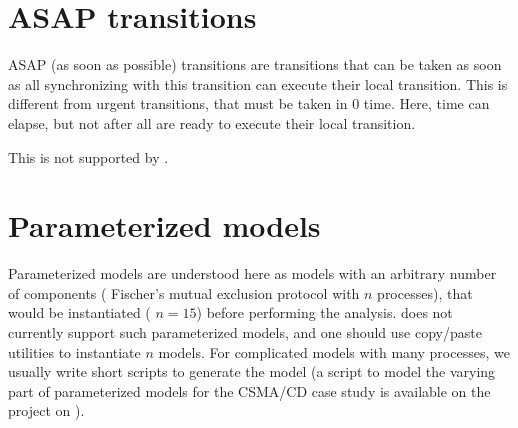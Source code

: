 % 




\section{ASAP transitions}

ASAP (as soon as possible) transitions are transitions that can be taken as soon as all \IPTA{} synchronizing with this transition can execute their local transition.
This is different from urgent transitions, that must be taken in 0 time.
Here, time can elapse, but not after all \IPTA{} are ready to execute their local transition.

This is not supported by \imitator{}. %



\section{Parameterized models}

Parameterized models are understood here as models with an arbitrary number of components (\eg{} Fischer's mutual exclusion protocol with $n$ processes), that would be instantiated (\eg{} $n = 15$) before performing the analysis.
\imitator{} does not currently support such parameterized models, and one should use copy/paste utilities to instantiate $n$ models.
For complicated models with many processes, we usually write short scripts to generate the model (a script  to model the varying part of parameterized models for the CSMA/CD case study is available on the \imitator{} project on \GitHubIMI{}).




